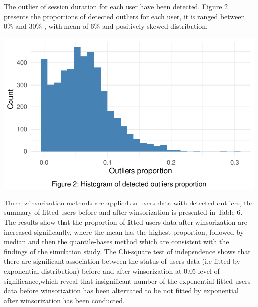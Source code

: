 \documentclass[
]{article}
\begin{document}
The outlier of session duration for each user have been detected. Figure
2 presents the proportions of detected outliers for each user, it is
ranged between 0\% and 30\% , with mean of 6\% and positively skewed
distribution.

\begin{CodeChunk}


\begin{center}\includegraphics{new_header_format_files/figure-latex/unnamed-chunk-9-1} \end{center}

\end{CodeChunk}

Three winsorization methods are applied on users data with detected
outliers, the summary of fitted users before and after winsorization is
presented in Table 6. The results show that the proportion of fitted
users data after winsorization are increased significantly, where the
mean has the highest proportion, followed by median and then the
quantile-bases method which are consistent with the findings of the
simulation study. The Chi-square test of independence shows that there
are significant association between the status of users data (i.e fitted
by exponential distribution) before and after winsorization at 0.05
level of significance,which reveal that insignificant number of the
exponential fitted users data before winsorization has been alternated
to be not fitted by exponential after winsorization has been conducted.
\end{document}
